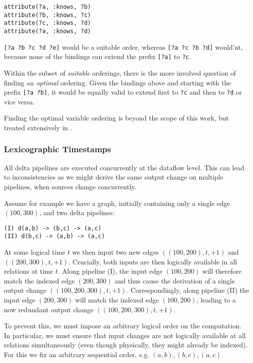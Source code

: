 \documentclass[../index.tex]{subfiles}
\begin{document}
\begin{verbatim}
attribute(?a, :knows, ?b)
attribute(?b, :knows, ?c)
attribute(?c, :knows, ?d)
attribute(?a, :knows, ?d)
\end{verbatim}

\texttt{[?a ?b ?c ?d ?e]} would be a suitable order, whereas
\texttt{[?a ?c ?b ?d]} would'nt, because none of the bindings can
extend the prefix \texttt{[?a]} to \texttt{?c}.

Within the subset of \emph{suitable} orderings, there is the more
involved question of finding an \emph{optimal} ordering. Given the
bindings above and starting with the prefix \texttt{[?a ?b]}, it would
be equally valid to extend first to \texttt{?c} and then to
\texttt{?d} or vice versa.

Finding the optimal variable ordering is beyond the scope of this
work, but treated extensively in \cite{abo2016faq}.

\subsubsection{Lexicographic Timestamps} \label{impl-altneu}

All delta pipelines are executed concurrently at the dataflow
level. This can lead to inconsistencies as we might derive the same
output change on multiple pipelines, when sources change
concurrently.

Assume for example we have a graph, initially containing only a single
edge $(100,300)$, and two delta pipelines:

\begin{verbatim}
(I) d(a,b) -> (b,c) -> (a,c)
(II) d(b,c) -> (a,b) -> (a,c)
\end{verbatim}

At some logical time $t$ we then input two new edges
$((100,200),t,+1)$ and $((200,300),t,+1)$. Crucially, both inputs are
then logically available in all relations at time $t$. Along pipeline
(I), the input edge $(100,200)$ will therefore match the indexed edge
$(200,300)$ and thus cause the derivation of a single output change
$((100,200,300),t,+1)$. Correspondingly, along pipeline (II) the input
edge $(200,300)$ will match the indexed edge $(100,200)$, leading to a
now redundant output change $((100,200,300),t,+1)$.

To prevent this, we must impose an arbitrary logical order on the
computation. In particular, we must ensure that input changes are not
logically available at all relations simultaneously (even though
physically, they might already be indexed). For this we fix an
arbitrary sequential order, e.g. $(a,b),(b,c),(a,c)$.
\end{document}
